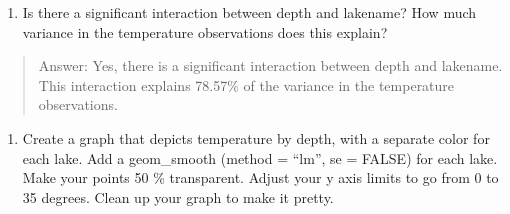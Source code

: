 \documentclass[]{article}
\newenvironment{Shaded}{\begin{snugshade}}{\end{snugshade}}
\newcommand{\KeywordTok}[1]{\textcolor[rgb]{0.13,0.29,0.53}{\textbf{#1}}}
\newcommand{\DataTypeTok}[1]{\textcolor[rgb]{0.13,0.29,0.53}{#1}}
\newcommand{\DecValTok}[1]{\textcolor[rgb]{0.00,0.00,0.81}{#1}}
\newcommand{\StringTok}[1]{\textcolor[rgb]{0.31,0.60,0.02}{#1}}
\newcommand{\CommentTok}[1]{\textcolor[rgb]{0.56,0.35,0.01}{\textit{#1}}}
\newcommand{\OtherTok}[1]{\textcolor[rgb]{0.56,0.35,0.01}{#1}}
\newcommand{\OperatorTok}[1]{\textcolor[rgb]{0.81,0.36,0.00}{\textbf{#1}}}
\newcommand{\NormalTok}[1]{#1}
\providecommand{\tightlist}{%
  \setlength{\itemsep}{0pt}\setlength{\parskip}{0pt}}
\begin{document}
\begin{enumerate}
\def\labelenumi{\arabic{enumi}.}
\setcounter{enumi}{6}
\tightlist
\item
  Is there a significant interaction between depth and lakename? How
  much variance in the temperature observations does this explain?
\end{enumerate}

\begin{quote}
Answer: Yes, there is a significant interaction between depth and
lakename. This interaction explains 78.57\% of the variance in the
temperature observations.
\end{quote}

\begin{enumerate}
\def\labelenumi{\arabic{enumi}.}
\setcounter{enumi}{7}
\tightlist
\item
  Create a graph that depicts temperature by depth, with a separate
  color for each lake. Add a geom\_smooth (method = ``lm'', se = FALSE)
  for each lake. Make your points 50 \% transparent. Adjust your y axis
  limits to go from 0 to 35 degrees. Clean up your graph to make it
  pretty.
\end{enumerate}

\begin{Shaded}
\end{Shaded}
\end{document}
